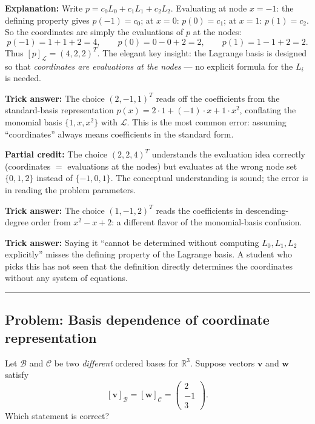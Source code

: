 \documentclass[12pt]{amsart}
\newcommand{\divider}{
  \vspace{-1em}
  \noindent
  \raisebox{-0.15ex}{\textbullet}%
  \hspace{0.5em}%
  \rule[0.5ex]{0.95\textwidth}{1.0pt}%
  \hspace{0.5em}%
  \raisebox{-0.15ex}{\textbullet}%
  \vspace{0em}
}
\begin{document}
\textbf{Explanation:}
Write $p = c_0 L_0 + c_1 L_1 + c_2 L_2$.
Evaluating at node $x=-1$: the defining property gives $p(-1) = c_0$;
at $x=0$: $p(0)=c_1$; at $x=1$: $p(1) = c_2$.
So the coordinates are simply the evaluations of $p$ at the nodes:
$$p(-1) = 1+1+2 = 4, \qquad p(0) = 0-0+2=2, \qquad p(1)=1-1+2=2.$$
Thus $[p]_\mathcal{L} = (4,2,2)^T$.
The elegant key insight: the Lagrange basis is designed so that
\emph{coordinates are evaluations at the nodes} --- no explicit formula for the
$L_i$ is needed.

\textbf{Trick answer:}
The choice $(2,-1,1)^T$ reads off the coefficients from the standard-basis
representation $p(x) = 2\cdot 1 + (-1)\cdot x + 1\cdot x^2$, conflating the
monomial basis $\{1,x,x^2\}$ with $\mathcal{L}$.
This is the most common error: assuming ``coordinates'' always means
coefficients in the standard form.

\textbf{Partial credit:}
The choice $(2,2,4)^T$ understands the evaluation idea correctly (coordinates
$=$ evaluations at the nodes) but evaluates at the wrong node set $\{0,1,2\}$
instead of $\{-1,0,1\}$.
The conceptual understanding is sound; the error is in reading the problem
parameters.

\textbf{Trick answer:}
The choice $(1,-1,2)^T$ reads the coefficients in descending-degree order from
$x^2-x+2$: a different flavor of the monomial-basis confusion.

\textbf{Trick answer:}
Saying it ``cannot be determined without computing $L_0,L_1,L_2$ explicitly''
misses the defining property of the Lagrange basis.
A student who picks this has not seen that the definition directly determines
the coordinates without any system of equations.

\divider

\subsection*{Problem: Basis dependence of coordinate representation}

Let $\mathcal{B}$ and $\mathcal{C}$ be two \emph{different} ordered bases for $\mathbb{R}^3$.
Suppose vectors $\mathbf{v}$ and $\mathbf{w}$ satisfy
$$[\mathbf{v}]_{\mathcal{B}} = [\mathbf{w}]_{\mathcal{C}} = \begin{pmatrix} 2 \\ -1 \\ 3 \end{pmatrix}.$$
Which statement is correct?
\end{document}
